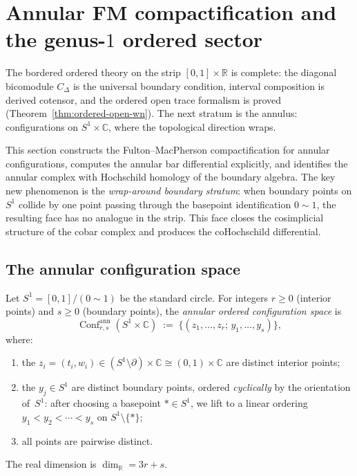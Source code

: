 \documentclass[11pt]{article}
\newcommand{\C}{\mathbb{C}}
\newcommand{\R}{\mathbb{R}}
\DeclareMathOperator{\Conf}{Conf}
\begin{document}
\section{Annular FM compactification and the genus-$1$ ordered sector}
\label{sec:annular-FM}

The bordered ordered theory on the strip $[0,1]\times\R$ is
complete: the diagonal bicomodule $C_\Delta$ is the universal
boundary condition, interval composition is derived cotensor, and
the ordered open trace formalism is proved
(Theorem~\ref{thm:ordered-open-wn}).  The next stratum is
the annulus: configurations on $S^1\times\C$, where the
topological direction wraps.

This section constructs the Fulton--MacPherson compactification
for annular configurations, computes the annular bar differential
explicitly, and identifies the annular complex with Hochschild
homology of the boundary algebra.  The key new phenomenon is
the \emph{wrap-around boundary stratum}: when boundary points
on $S^1$ collide by one point passing through the basepoint
identification $0\sim 1$, the resulting face has no analogue
in the strip.  This face closes the cosimplicial structure of
the cobar complex and produces the coHochschild differential.

\subsection{The annular configuration space}

\begin{definition}
\label{def:annular-config-wn}
Let $S^1=[0,1]/(0\sim 1)$ be the standard circle.  For integers
$r\ge 0$ (interior points) and $s\ge 0$ (boundary points), the
\emph{annular ordered configuration space} is
\[
\Conf_{r,s}^{\mathrm{ann}}(S^1\times\C)
\;:=\;
\bigl\{
(z_1,\dotsc,z_r;\,y_1,\dotsc,y_s)
\bigr\},
\]
where:
\begin{enumerate}[label=(\alph*)]
\item the $z_i=(t_i,w_i)\in (S^1\setminus\partial)\times\C
\cong (0,1)\times\C$ are distinct interior points;
\item the $y_j\in S^1$ are distinct boundary points, ordered
\emph{cyclically} by the orientation of~$S^1$: after choosing
a basepoint $*\in S^1$, we lift to a linear ordering
$y_1<y_2<\cdots<y_s$ on $S^1\setminus\{*\}$;
\item all points are pairwise distinct.
\end{enumerate}
The real dimension is $\dim_\R=3r+s$.
\end{definition}
\end{document}
